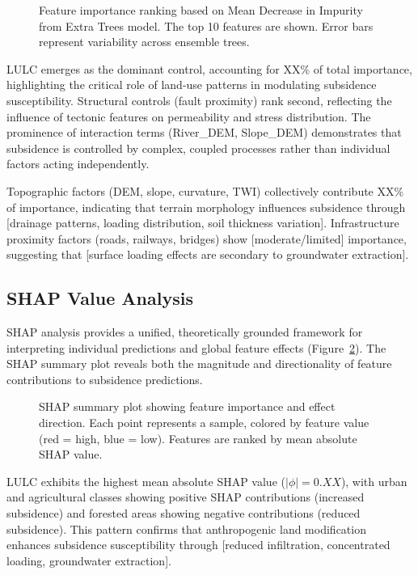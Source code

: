\begin{figure}[!t]
\centering
\caption{Feature importance ranking based on Mean Decrease in Impurity from Extra Trees model. The top 10 features are shown. Error bars represent variability across ensemble trees.}
\label{fig:mdi_importance}
\end{figure}

LULC emerges as the dominant control, accounting for XX\% of total importance, highlighting the critical role of land-use patterns in modulating subsidence susceptibility. Structural controls (fault proximity) rank second, reflecting the influence of tectonic features on permeability and stress distribution. The prominence of interaction terms (River\_DEM, Slope\_DEM) demonstrates that subsidence is controlled by complex, coupled processes rather than individual factors acting independently.

Topographic factors (DEM, slope, curvature, TWI) collectively contribute XX\% of importance, indicating that terrain morphology influences subsidence through [drainage patterns, loading distribution, soil thickness variation]. Infrastructure proximity factors (roads, railways, bridges) show [moderate/limited] importance, suggesting that [surface loading effects are secondary to groundwater extraction].

\subsection{SHAP Value Analysis}

SHAP analysis provides a unified, theoretically grounded framework for interpreting individual predictions and global feature effects (Figure~\ref{fig:shap_summary}). The SHAP summary plot reveals both the magnitude and directionality of feature contributions to subsidence predictions.

\begin{figure}[!t]
\centering
\caption{SHAP summary plot showing feature importance and effect direction. Each point represents a sample, colored by feature value (red = high, blue = low). Features are ranked by mean absolute SHAP value.}
\label{fig:shap_summary}
\end{figure}

LULC exhibits the highest mean absolute SHAP value ($|\phi| = 0.XX$), with urban and agricultural classes showing positive SHAP contributions (increased subsidence) and forested areas showing negative contributions (reduced subsidence). This pattern confirms that anthropogenic land modification enhances subsidence susceptibility through [reduced infiltration, concentrated loading, groundwater extraction].

